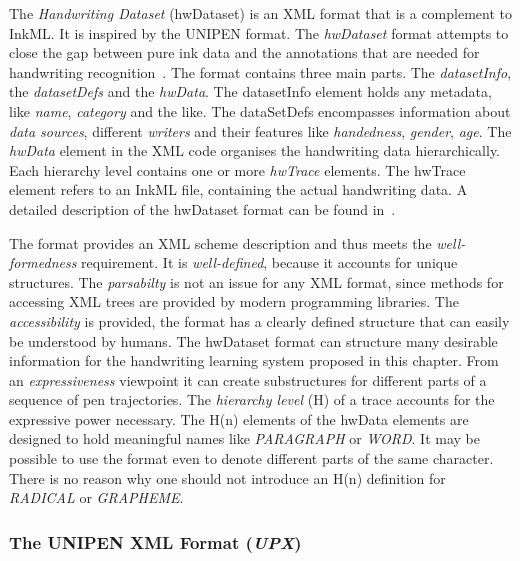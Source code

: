The \emph{Handwriting Dataset} (hwDataset) is an XML format that is a complement
to InkML. It is inspired by the UNIPEN format. The \emph{hwDataset} format 
attempts to close the gap between pure ink data and the annotations that are 
needed for handwriting recognition~. 
The format contains three main parts. The \emph{datasetInfo}, 
the \emph{datasetDefs} and the \emph{hwData}. The datasetInfo element holds
any metadata, like \emph{name}, \emph{category} and the like.
The dataSetDefs encompasses information about \emph{data sources}, different
\emph{writers} and their features like \emph{handedness}, \emph{gender}, 
\emph{age}. The \emph{hwData} element in the XML code organises the 
handwriting data hierarchically. Each hierarchy level contains one or 
more \emph{hwTrace} elements. The hwTrace element refers to an InkML file, 
containing the actual handwriting data. A detailed description of the hwDataset 
format can be found in~. 

The format provides an XML scheme description and thus meets the 
\emph{well-formedness} requirement. It is \emph{well-defined}, 
because it accounts for unique structures. The \emph{parsabilty} is not an 
issue for any XML format, since methods for accessing XML trees are provided 
by modern programming libraries.
The \emph{accessibility} is provided, the format has a clearly defined structure
that can easily be understood by humans.
The hwDataset format can structure many desirable information for the handwriting
learning system proposed in this chapter. 
From an \emph{expressiveness} viewpoint it can create substructures for 
different parts of a sequence of pen trajectories. The \emph{hierarchy level} (H)
of a trace accounts for the expressive power necessary. The H(n) elements 
of the hwData elements are designed to hold meaningful names like 
\emph{PARAGRAPH} or \emph{WORD}. It may be possible to use the format even to 
denote different parts of the same character. There is no reason why one should
not introduce an H(n) definition for \emph{RADICAL} or \emph{GRAPHEME}.

\subsubsection{The UNIPEN XML Format (\emph{UPX})}
\label{sec:hwre:unipenformatupx}

